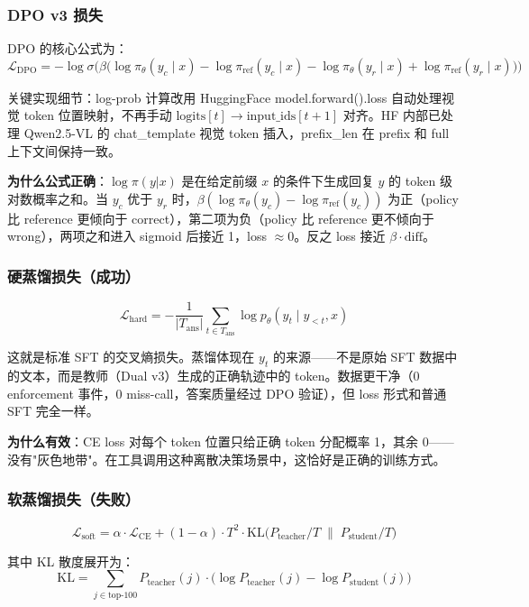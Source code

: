 \documentclass[12pt,a4paper]{ctexart}
\begin{document}
\subsubsection{DPO v3 损失}

DPO 的核心公式为：
$$\mathcal{L}_{\text{DPO}} = -\log\sigma\Big(\beta\big(\log\pi_\theta(y_c \mid x) - \log\pi_{\text{ref}}(y_c \mid x) - \log\pi_\theta(y_r \mid x) + \log\pi_{\text{ref}}(y_r \mid x)\big)\Big)$$

关键实现细节：log-prob 计算改用 HuggingFace model.forward().loss 自动处理视觉 token 位置映射，不再手动 $\text{logits}[t] \to \text{input\_ids}[t+1]$ 对齐。HF 内部已处理 Qwen2.5-VL 的 chat\_template 视觉 token 插入，prefix\_len 在 prefix 和 full 上下文间保持一致。

\textbf{为什么公式正确}：$\log\pi(y|x)$ 是在给定前缀 $x$ 的条件下生成回复 $y$ 的 token 级对数概率之和。当 $y_c$ 优于 $y_r$ 时，$\beta(\log\pi_\theta(y_c)-\log\pi_{\text{ref}}(y_c))$ 为正（policy 比 reference 更倾向于 correct），第二项为负（policy 比 reference 更不倾向于 wrong），两项之和进入 sigmoid 后接近 1，loss $\approx 0$。反之 loss 接近 $\beta \cdot \text{diff}$。

\subsubsection{硬蒸馏损失（成功）}

$$\mathcal{L}_{\text{hard}} = -\frac{1}{|T_{\text{ans}}|}\sum_{t \in T_{\text{ans}}} \log p_\theta(y_t \mid y_{<t}, x)$$

这就是标准 SFT 的交叉熵损失。蒸馏体现在 $y_t$ 的来源——不是原始 SFT 数据中的文本，而是教师（Dual v3）生成的正确轨迹中的 token。数据更干净（0 enforcement 事件，0 miss-call，答案质量经过 DPO 验证），但 loss 形式和普通 SFT 完全一样。

\textbf{为什么有效}：CE loss 对每个 token 位置只给正确 token 分配概率 1，其余 0——没有"灰色地带"。在工具调用这种离散决策场景中，这恰好是正确的训练方式。

\subsubsection{软蒸馏损失（失败）}

$$\mathcal{L}_{\text{soft}} = \alpha \cdot \mathcal{L}_{\text{CE}} + (1-\alpha) \cdot T^2 \cdot \text{KL}\big(P_{\text{teacher}}/T \;\|\; P_{\text{student}}/T\big)$$

其中 KL 散度展开为：
$$\text{KL} = \sum_{j \in \text{top-100}} P_{\text{teacher}}(j) \cdot \big(\log P_{\text{teacher}}(j) - \log P_{\text{student}}(j)\big)$$
\end{document}
